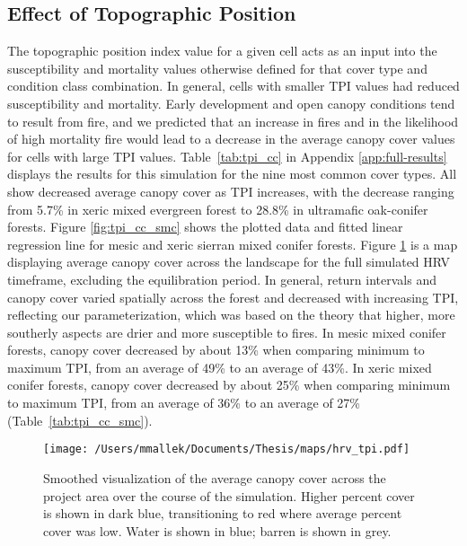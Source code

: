 \clearpage


\subsection{Effect of Topographic Position}

The topographic position index value for a given cell acts as an input into the susceptibility and mortality values otherwise defined for that cover type and condition class combination. In general, cells with smaller TPI values had reduced susceptibility and mortality. Early development and open canopy conditions tend to result from fire, and we predicted that an increase in fires and in the likelihood of high mortality fire would lead to a decrease in the average canopy cover values for cells with large TPI values. Table~\ref{tab:tpi_cc} in Appendix \ref{app:full-results} displays the results for this simulation for the nine most common cover types. All  show decreased average canopy cover as TPI increases, with the decrease ranging from 5.7\% in xeric mixed evergreen forest to 28.8\% in ultramafic oak-conifer forests. Figure \ref{fig:tpi_cc_smc} shows the plotted data and fitted linear regression line for mesic and xeric sierran mixed conifer forests. Figure \ref{fig:averagecc} is a map displaying average canopy cover across the landscape for the full simulated HRV timeframe, excluding the equilibration period. In general, return intervals and canopy cover varied spatially across the forest and decreased with increasing TPI, reflecting our parameterization, which was based on the theory that higher, more southerly aspects are drier and more susceptible to fires. In mesic mixed conifer forests, canopy cover decreased by about 13\% when comparing minimum to maximum TPI, from an average of 49\% to an average of 43\%. In xeric mixed conifer forests, canopy cover decreased by about 25\% when comparing minimum to maximum TPI, from an average of 36\% to an average of 27\% (Table~\ref{tab:tpi_cc_smc}).

\begin{figure}[!htbp]
\centering
\texttt{[image: /Users/mmallek/Documents/Thesis/maps/hrv\_tpi.pdf]}
\caption{Smoothed visualization of the average canopy cover across the project area over the course of the simulation. Higher percent cover is shown in dark blue, transitioning to red where average percent cover was low. Water is shown in blue; barren is shown in grey.}
\label{fig:averagecc}
\end{figure}

